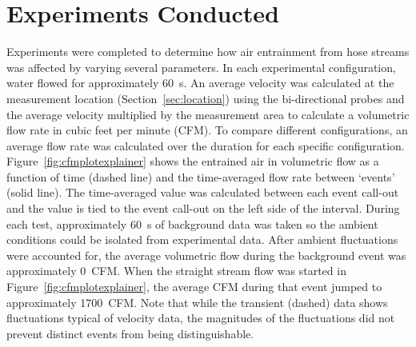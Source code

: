\documentclass[12pt,oneside]{book}
\begin{document}



\chapter{Experiments Conducted}

Experiments were completed to determine how air entrainment from hose streams was affected by varying several parameters. In each experimental configuration, water flowed for approximately 60~s. An average velocity was calculated at the measurement location (Section~\ref{sec:location}) using the bi-directional probes and the average velocity multiplied by the measurement area to calculate a volumetric flow rate in cubic feet per minute (CFM). To compare different configurations, an average flow rate was calculated over the duration for each specific configuration. Figure~\ref{fig:cfmplotexplainer} shows the entrained air in volumetric flow as a function of time (dashed line) and the time-averaged flow rate between `events' (solid line). The time-averaged value was calculated between each event call-out and the value is tied to the event call-out on the left side of the interval. During each test, approximately 60~s of background data was taken so the ambient conditions could be isolated from experimental data. After ambient fluctuations were accounted for, the average volumetric flow during the background event was approximately 0~CFM. When the straight stream flow was started in Figure~\ref{fig:cfmplotexplainer}, the average CFM during that event jumped to approximately 1700~CFM. Note that while the transient (dashed) data shows fluctuations typical of velocity data, the magnitudes of the fluctuations did not prevent distinct events from being distinguishable.
\end{document}

